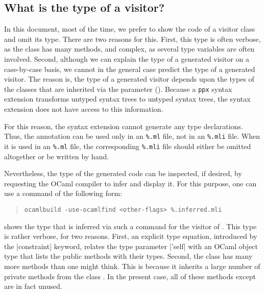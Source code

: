 \documentclass[11pt,a4paper,twoside]{article}
\begin{document}

\subsection{What is the type of a visitor?}
\label{sec:intro:type}

In this document, most of the time, we prefer to show the code of a visitor
class and omit its type. There are two reasons for this. First, this type is
often verbose, as the class has many methods, and complex, as several type
variables are often involved. Second, although we can explain the type of a
generated visitor on a case-by-case basis, we cannot in the general case
predict the type of a generated visitor.
The reason is, the type of a generated visitor depends upon the
types of the classes that are inherited via the \ancestors parameter
(). Because a \texttt{ppx} syntax extension transforms
untyped syntax trees to untyped syntax trees, the \visitors syntax extension
does not have access to this information.

For this reason, the \visitors syntax extension cannot generate any type
declarations. Thus, the annotation \derivingvisitors can be used only in an
\texttt{\%.ml} file, not in an \texttt{\%.mli} file. When it is used in an
\texttt{\%.ml} file, the corresponding \texttt{\%.mli} file should either be
omitted altogether or be written by hand.



Nevertheless, the type of the generated code can be inspected, if desired, by
requesting the OCaml compiler to infer and display it. For this purpose, one
can use a command of the following form:
\begin{quote}
\verb|ocamlbuild -use-ocamlfind <other-flags> %.inferred.mli|
\end{quote}

 shows the type that is inferred via such a command for the
\iter visitor of . This type is rather verbose, for two
reasons. First, an explicit type equation, introduced by the \oc|constraint|
keyword, relates the type parameter \oc|'self| with an OCaml object type that
lists the public methods with their types. Second, the class \iter has many more
methods than one might think. This is because it inherits a large number of
private methods from the class . In the present case, all of
these methods except  are in fact unused.
\end{document}
